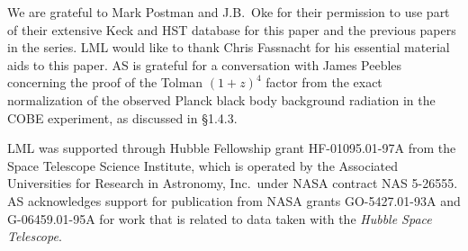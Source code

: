 \documentclass[preprint]{aastex}
\begin{document}
\acknowledgments 

We are grateful to Mark Postman and J.B.\ Oke for their permission to
use part of their extensive Keck and HST database for this paper and
the previous papers in the series. LML would like to thank Chris
Fassnacht for his essential material aids to this paper. AS is
grateful for a conversation with James Peebles concerning the proof of
the Tolman $(1 + z)^4$ factor from the exact normalization of the
observed Planck black body background radiation in the COBE
experiment, as discussed in \S 1.4.3.

LML was supported through Hubble Fellowship grant HF-01095.01-97A from
the Space Telescope Science Institute, which is operated by the
Associated Universities for Research in Astronomy, Inc.\ under NASA
contract NAS 5-26555. AS acknowledges support for publication from
NASA grants GO-5427.01-93A and G-06459.01-95A for work that is related
to data taken with the {\it Hubble Space Telescope}.


\newpage
\end{document}
